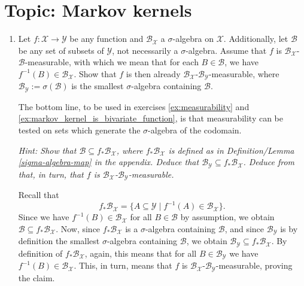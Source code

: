 



\section*{Topic: Markov kernels}

\begin{enumerate}[label=2.\arabic*]
    \item \label{generating-sets}
    Let $f: \mathcal{X} \to \mathcal{Y}$ be any function and $\mathcal{B}_{\mathcal{X}}$ a $\sigma$-algebra on $\mathcal{X}$.
    Additionally, let $\mathcal{B}$ be any set of subsets of $\mathcal{Y}$, not necessarily a $\sigma$-algebra.
    Assume that $f$ is $\mathcal{B}_{\mathcal{X}}$-$\mathcal{B}$-measurable, with which we mean that for each $B \in \mathcal{B}$, we have $f^{-1}(B) \in \mathcal{B}_{\mathcal{X}}$.
    Show that $f$ is then already $\mathcal{B}_\mathcal{X}$-$\mathcal{B}_{\mathcal{Y}}$-measurable, where $\mathcal{B}_{\mathcal{Y}} := \sigma{(\mathcal{B})}$ is the smallest $\sigma$-algebra containing $\mathcal{B}$.

    The bottom line, to be used in exercises \ref{ex:measurability} and \ref{ex:markov_kernel_is_bivariate_function}, is that measurability can be tested on sets which generate the $\sigma$-algebra of the codomain.

    \emph{Hint: Show that $\mathcal{B} \subseteq f_*\mathcal{B}_{\mathcal{X}}$, where $f_*\mathcal{B}_{\mathcal{X}}$ is defined as in Definition/Lemma \ref*{sigma-algebra-map} in the appendix.
    Deduce that $\mathcal{B}_{\mathcal{Y}} \subseteq f_* \mathcal{B}_{\mathcal{X}}$.
    Deduce from that, in turn, that $f$ is $\mathcal{B}_{\mathcal{X}}$-$\mathcal{B}_{\mathcal{Y}}$-measurable.}

    \begin{ungradedsolution}
        Recall that
        \begin{equation*}
            f_* \mathcal{B}_{\mathcal{X}} = \{A \subseteq \mathcal{Y} \mid f^{-1}(A) \in \mathcal{B}_{\mathcal{X}}\}.
            \label{eq:recall_definition}
        \end{equation*}
        Since we have $f^{-1}(B) \in \mathcal{B}_{\mathcal{X}}$ for all $B \in \mathcal{B}$ by assumption, we obtain $\mathcal{B} \subseteq f_* \mathcal{B}_{\mathcal{X}}$.
        Now, since $f_* \mathcal{B}_{\mathcal{X}}$ is a $\sigma$-algebra containing $\mathcal{B}$, and since $\mathcal{B}_{\mathcal{Y}}$ is by definition the smallest $\sigma$-algebra containing $\mathcal{B}$, we obtain $\mathcal{B}_{\mathcal{Y}} \subseteq f_* \mathcal{B}_{\mathcal{X}}$.
        By definition of $f_* \mathcal{B}_{\mathcal{X}}$, again, this means that for all $B \in \mathcal{B}_{\mathcal{Y}}$ we have $f^{-1}(B) \in \mathcal{B}_{\mathcal{X}}$.
        This, in turn, means that $f$ is $\mathcal{B}_{\mathcal{X}}$-$\mathcal{B}_{\mathcal{Y}}$-measurable, proving the claim.
    \end{ungradedsolution}


\end{enumerate}

